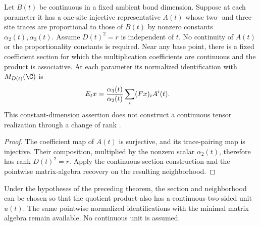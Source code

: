 \begin{lemma}
    \label{thm:spt_trace_quotient_continuous_algebra}
    \leanok
    Let $B(t)$ be continuous in a fixed ambient bond dimension.
    Suppose at each parameter it has a one-site injective representative
    $A(t)$ whose two- and three-site traces are proportional to those
    of $B(t)$ by nonzero constants $\alpha_2(t),\alpha_3(t)$.
    Assume $D(t)^2=r$ is independent of $t$.
    No continuity of $A(t)$ or the proportionality constants is required.
    Near any base point, there is a fixed coefficient section for which
    the multiplication coefficients are continuous and the product is
    associative. At each parameter its normalized identification with
    $M_{D(t)}(\C)$ is
    \begin{align}
        E_t x & =\frac{\alpha_3(t)}{\alpha_2(t)}
        \sum_i(Fx)_iA^i(t).
        \notag
    \end{align}
    This constant-dimension assertion does not construct a continuous
    tensor realization through a change of rank
    \cite{gap:spc11_spt_interpolation_upper_range}.
\end{lemma}

\begin{proof}\leanok
    The coefficient map of $A(t)$ is surjective, and its trace-pairing
    map is injective. Their composition, multiplied by the nonzero
    scalar $\alpha_2(t)$, therefore has rank $D(t)^2=r$.
    Apply the continuous-section construction and the pointwise
    matrix-algebra recovery on the resulting neighborhood.
\end{proof}

\begin{lemma}
    \label{thm:spt_trace_quotient_continuous_unit}
    \leanok
    Under the hypotheses of the preceding theorem, the section and
    neighborhood can be chosen so that the quotient product also has
    a continuous two-sided unit $u(t)$. The same pointwise normalized
    identifications with the minimal matrix algebra remain available.
    No continuous unit is assumed.
\end{lemma}

